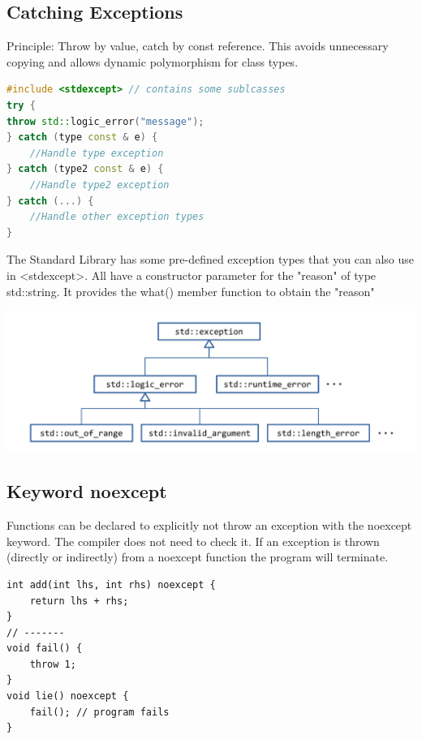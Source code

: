 \subsection{Catching Exceptions}
Principle: Throw by value, catch by const reference. This avoids unnecessary copying and allows dynamic polymorphism for class types.
\begin{lstlisting}[language=C++]
#include <stdexcept> // contains some sublcasses
try {
throw std::logic_error("message");
} catch (type const & e) {
	//Handle type exception 
} catch (type2 const & e) {
	//Handle type2 exception 
} catch (...) {
	//Handle other exception types 
}
\end{lstlisting}
The Standard Library has some pre-defined exception types that you can also use in <stdexcept>. All have a constructor parameter for the "reason" of type std::string. It provides the what() member function to obtain the "reason"
\begin{center}
	\includegraphics[width=0.75\linewidth]{images/exceptions}
\end{center}

\subsection{Keyword noexcept}
Functions can be declared to explicitly not throw an exception with the noexcept keyword. The compiler does not need to check it.  If an exception is thrown (directly or indirectly) from a noexcept function the program will terminate.

\begin{lstlisting}
int add(int lhs, int rhs) noexcept {
	return lhs + rhs; 
}
// -------
void fail() {
	throw 1; 
}
void lie() noexcept {
	fail(); // program fails
}
\end{lstlisting}


